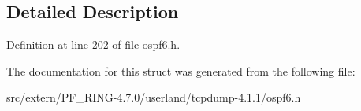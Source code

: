 \subsection{Detailed Description}


Definition at line 202 of file ospf6.h.



The documentation for this struct was generated from the following file:\begin{DoxyCompactItemize}
\item 
src/extern/PF\_\-RING-\/4.7.0/userland/tcpdump-\/4.1.1/ospf6.h\end{DoxyCompactItemize}
